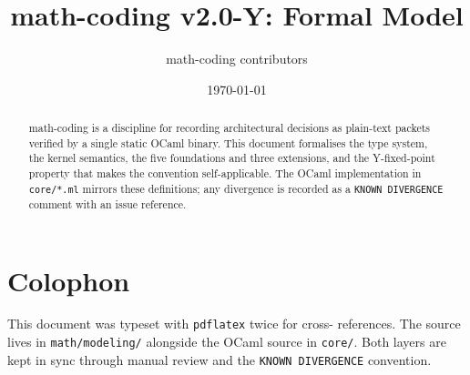 \documentclass[11pt,a4paper]{article}
\begin{document}
\title{math-coding v2.0-Y: Formal Model}
\author{math-coding contributors}
\date{\today}

\maketitle

\begin{abstract}
math-coding is a discipline for recording architectural decisions as
plain-text packets verified by a single static OCaml binary. This
document formalises the type system, the kernel semantics, the five
foundations and three extensions, and the Y-fixed-point property
that makes the convention self-applicable. The OCaml implementation
in \texttt{core/*.ml} mirrors these definitions; any divergence is
recorded as a \texttt{KNOWN DIVERGENCE} comment with an issue
reference.
\end{abstract}

\tableofcontents







\section*{Colophon}

This document was typeset with \texttt{pdflatex} twice for cross-
references. The source lives in \texttt{math/modeling/} alongside
the OCaml source in \texttt{core/}. Both layers are kept in sync
through manual review and the \texttt{KNOWN DIVERGENCE} convention.
\end{document}
